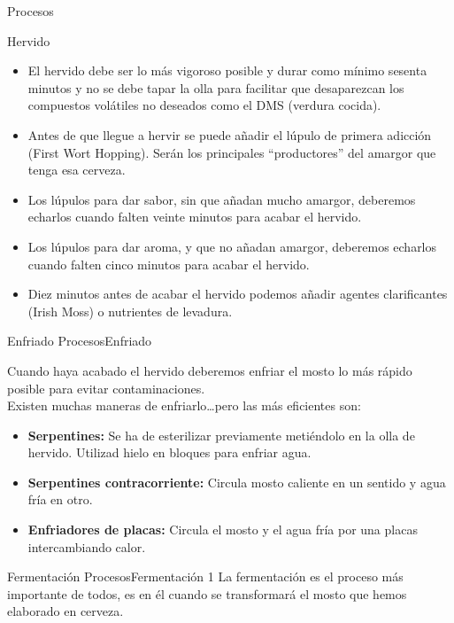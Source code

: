 \begin{frame}[fragile]{Procesos}
\begin{block}{Hervido}
\begin{itemize}
\item
  El hervido debe ser lo más vigoroso posible y durar como mínimo
  sesenta minutos y no se debe tapar la olla para facilitar que
  desaparezcan los compuestos volátiles no deseados como el DMS (verdura
  cocida).
\item
  Antes de que llegue a hervir se puede añadir el lúpulo de primera
  adicción (First Wort Hopping). Serán los principales ``productores''
  del amargor que tenga esa cerveza.
\item
  Los lúpulos para dar sabor, sin que añadan mucho amargor, deberemos
  echarlos cuando falten veinte minutos para acabar el hervido.
\item
  Los lúpulos para dar aroma, y que no añadan amargor, deberemos
  echarlos cuando falten cinco minutos para acabar el hervido.
\item
  Diez minutos antes de acabar el hervido podemos añadir agentes
  clarificantes (Irish Moss) o nutrientes de levadura.
\end{itemize}
\end{block}

\begin{block}{Enfriado}
\protect\hypertarget{enfriado}{}
ProcesosEnfriado

Cuando haya acabado el hervido deberemos enfriar el mosto lo más rápido
posible para evitar contaminaciones.\\
Existen muchas maneras de enfriarlo\ldots pero las más eficientes son:

\begin{itemize}
\item
  \textbf{Serpentines:} Se ha de esterilizar previamente metiéndolo en
  la olla de hervido. Utilizad hielo en bloques para enfriar agua.
\item
  \textbf{Serpentines contracorriente:} Circula mosto caliente en un
  sentido y agua fría en otro.
\item
  \textbf{Enfriadores de placas:} Circula el mosto y el agua fría por
  una placas intercambiando calor.
\end{itemize}
\end{block}

\begin{block}{Fermentación}
\protect\hypertarget{fermentaciuxf3n}{}
ProcesosFermentación 1 La fermentación es el proceso más importante de
todos, es en él cuando se transformará el mosto que hemos elaborado en
cerveza.


\end{block}
\end{frame}
